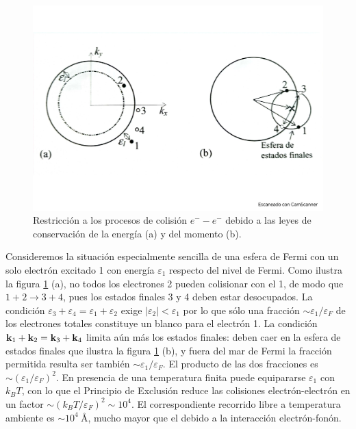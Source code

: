\begin{figure}[h!] \centering
	\includegraphics[scale=0.35]{Cuerpo/Ch_06/Fotos libro 4.pdf}
	\caption{Restricción a los procesos de colisión $e^- - e^-$ debido a las leyes de conservación de la energía (a) y del momento (b).}
	\label{Fig:06-04}
\end{figure}  

Consideremos la situación especialmente sencilla de una esfera de Fermi con un solo electrón excitado 1 con energía $\varepsilon_1$ respecto del nivel de Fermi. Como ilustra la figura \ref{Fig:06-04} (a), no todos los electrones 2 pueden colisionar con el 1, de modo que $1+2\rightarrow3+4$, pues los estados finales 3 y 4 deben estar desocupados. La condición $\varepsilon_3 + \varepsilon_4 = \varepsilon_1 + \varepsilon_2$ exige $|\varepsilon_2|<\varepsilon_1$ por lo que sólo una fracción $\sim \varepsilon_1 / \varepsilon_F$ de los electrones totales constituye un blanco para el electrón 1. La condición $\mathbf{k}_1 + \mathbf{k}_2 = \mathbf{k}_3 + \mathbf{k}_4$ limita aún más los estados finales: deben caer en la esfera de estados finales que ilustra la figura \ref{Fig:06-04} (b), y fuera del mar de Fermi la fracción permitida resulta ser también $\sim \varepsilon_1 / \varepsilon_F$. El producto de las dos fracciones es $\sim (\varepsilon_1/\varepsilon_F)^2$. 
En presencia de una temperatura finita puede equipararse $\varepsilon_1$ con $k_BT$, con lo que el Principio de Exclusión reduce las colisiones electrón-electrón en un factor $\sim (k_BT/\varepsilon_F)^2 \sim 10^4$. El correspondiente recorrido libre a temperatura ambiente es $\sim 10^4 \ \unit{\angstrom}$, mucho mayor que el debido a la interacción electrón-fonón.
